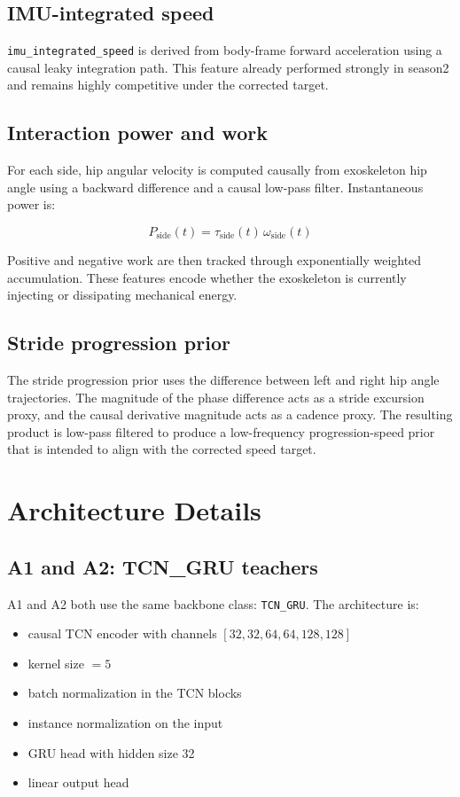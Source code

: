 \documentclass[11pt,a4paper]{article}
\begin{document}
\subsection{IMU-integrated speed}

\texttt{imu\_integrated\_speed} is derived from body-frame forward acceleration using a causal leaky integration path.
This feature already performed strongly in season2 and remains highly competitive under the corrected target.

\subsection{Interaction power and work}

For each side, hip angular velocity is computed causally from exoskeleton hip angle using a backward difference and a causal low-pass filter.
Instantaneous power is:

\[
P_{\mathrm{side}}(t) = \tau_{\mathrm{side}}(t)\,\omega_{\mathrm{side}}(t)
\]

Positive and negative work are then tracked through exponentially weighted accumulation.
These features encode whether the exoskeleton is currently injecting or dissipating mechanical energy.

\subsection{Stride progression prior}

The stride progression prior uses the difference between left and right hip angle trajectories.
The magnitude of the phase difference acts as a stride excursion proxy, and the causal derivative magnitude acts as a cadence proxy.
The resulting product is low-pass filtered to produce a low-frequency progression-speed prior that is intended to align with the corrected speed target.

\section{Architecture Details}

\subsection{A1 and A2: TCN\_GRU teachers}

A1 and A2 both use the same backbone class: \texttt{TCN\_GRU}.
The architecture is:
\begin{itemize}
\item causal TCN encoder with channels \([32,32,64,64,128,128]\)
\item kernel size \(= 5\)
\item batch normalization in the TCN blocks
\item instance normalization on the input
\item GRU head with hidden size 32
\item linear output head
\end{itemize}
\end{document}
